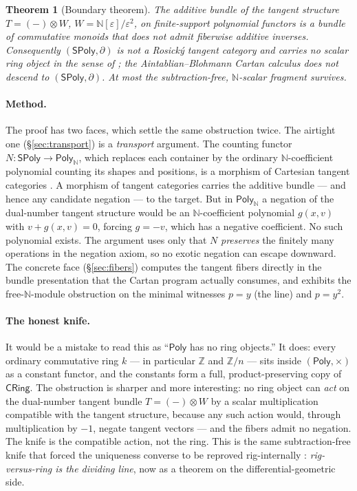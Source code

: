 \documentclass[11pt]{article}
\newtheorem{theorem}{Theorem}
\theoremstyle{definition}
\newcommand{\SPoly}{\mathsf{SPoly}}
\newcommand{\PolyN}{\mathsf{Poly}_{\mathbb{N}}}
\newcommand{\Poly}{\mathsf{Poly}}
\newcommand{\CRing}{\mathsf{CRing}}
\newcommand{\N}{\mathbb{N}}
\newcommand{\Z}{\mathbb{Z}}
\begin{document}
\begin{theorem}[Boundary theorem]\label{thm:main-intro}
The additive bundle of the tangent structure $T=(-)\otimes W$, $W=\N[\varepsilon]/\varepsilon^2$, on
finite-support polynomial functors is a bundle of commutative monoids that does not admit
fiberwise additive inverses. Consequently $(\SPoly,\partial)$ is not a Rosick\'y tangent
category and carries no scalar ring object in the sense of
\cite{AintablianBlohmann2026}; the Aintablian--Blohmann Cartan calculus does not descend to
$(\SPoly,\partial)$. At most the subtraction-free, $\N$-scalar fragment survives.
\end{theorem}

\paragraph{Method.}
The proof has two faces, which settle the same obstruction twice. The airtight one
(\S\ref{sec:transport}) is a \emph{transport} argument. The counting functor
$N:\SPoly\to\PolyN$, which replaces each container by the ordinary $\N$-coefficient
polynomial counting its shapes and positions, is a morphism of Cartesian tangent
categories \cite{MacBethTangent}. A morphism of tangent categories carries the additive
bundle --- and hence any candidate negation --- to the target. But in $\PolyN$ a negation
of the dual-number tangent structure would be an $\N$-coefficient polynomial $g(x,v)$ with
$v+g(x,v)=0$, forcing $g=-v$, which has a negative coefficient. No such polynomial exists.
The argument uses only that $N$ \emph{preserves} the finitely many operations in the
negation axiom, so no exotic negation can escape downward. The concrete face
(\S\ref{sec:fibers}) computes the tangent fibers directly in the bundle presentation that
the Cartan program actually consumes, and exhibits the free-$\N$-module obstruction on the
minimal witnesses $p=y$ (the line) and $p=y^2$.

\paragraph{The honest knife.}
It would be a mistake to read this as ``$\Poly$ has no ring objects.'' It does: every
ordinary commutative ring $k$ --- in particular $\Z$ and $\Z/n$ --- sits inside
$(\Poly,\times)$ as a constant functor, and the constants form a full, product-preserving
copy of $\CRing$. The obstruction is sharper and more interesting: no ring object can
\emph{act} on the dual-number tangent bundle $T=(-)\otimes W$ by a scalar multiplication
compatible with the tangent structure, because any such action would, through
multiplication by $-1$, negate tangent vectors --- and the fibers admit no negation. The
knife is the compatible action, not the ring. This is the same subtraction-free knife that
forced the uniqueness converse to be reproved rig-internally
\cite{MacBethUniqueness}: \emph{rig-versus-ring is the dividing line}, now as a theorem on
the differential-geometric side.
\end{document}
